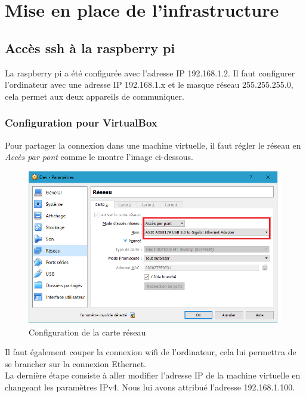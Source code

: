 \section{Mise en place de l'infrastructure}
\subsection{Accès ssh à la raspberry pi}
La raspberry pi a été configurée avec l'adresse IP 192.168.1.2. Il faut configurer l'ordinateur avec une adresse IP 192.168.1.x et le masque réseau 255.255.255.0, cela permet aux deux appareils de communiquer.
\subsubsection{Configuration pour VirtualBox}
Pour partager la connexion dans une machine virtuelle, il faut régler le réseau en \textit{Accès par pont} comme le montre l'image ci-dessous.
\begin{figure}[H]
	\begin{center}
		\includegraphics[width=14cm]{img/vmConfig1.png}
		\caption{Configuration de la carte réseau}
		\label{evLinuxConfig1}
	\end{center}
\end{figure}
Il faut également couper la connexion wifi de l'ordinateur, cela lui permettra de se brancher sur la connexion Ethernet.\\
La dernière étape consiste à aller modifier l'adresse IP de la machine virtuelle en changeant les paramètres IPv4. Nous lui avons attribué l'adresse 192.168.1.100.
